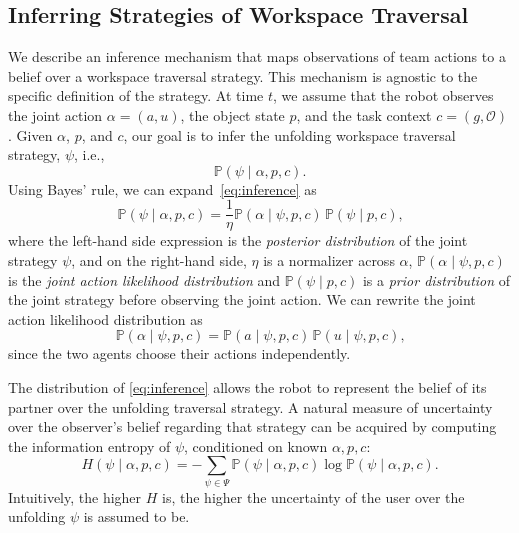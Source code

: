 \subsection{Inferring Strategies of Workspace Traversal}

We describe an inference mechanism that maps observations of team actions to a belief over a workspace traversal strategy. This mechanism is agnostic to the specific definition of the strategy. At time $t$, we assume that the robot observes the joint action $\alpha = (a, u)$, the object state $p$, and the task context $c = (g, \mathcal{O})$. Given $\alpha$, $p$, and $c$, our goal is to infer the unfolding workspace traversal strategy, $\psi$, i.e.,
\begin{equation}
    \mathbb{P}(\psi \mid \alpha, p, c)\mbox{.}\label{eq:inference}
\end{equation}
Using Bayes' rule, we can expand~\eqref{eq:inference} as
\begin{equation}
    \mathbb{P}(\psi \mid \alpha, p, c) = \frac{1}{\eta} \mathbb{P}(\alpha \mid \psi, p, c)\,\mathbb{P}(\psi \mid p, c)\mbox{,}\label{eq:inference-bayes}
\end{equation}
where the left-hand side expression is the \emph{posterior distribution} of the joint strategy $\psi$, and on the right-hand side, $\eta$ is a normalizer across $\alpha$, $\mathbb{P}(\alpha \mid \psi, p, c)$ is the \emph{joint action likelihood distribution} and $\mathbb{P}(\psi \mid p, c)$ is a \emph{prior distribution} of the joint strategy before observing the joint action. We can rewrite the joint action likelihood distribution as
\begin{equation}
    \mathbb{P}(\alpha \mid \psi, p, c) = \mathbb{P}(a \mid \psi, p, c)\,\mathbb{P}(u \mid \psi, p, c)\mbox{,}
\end{equation}
since the two agents choose their actions independently.

The distribution of \eqref{eq:inference} allows the robot to represent the belief of its partner over the unfolding traversal strategy. A natural measure of uncertainty over the observer's belief regarding that strategy can be acquired by computing the information entropy of $\psi$, conditioned on known $\alpha, p, c$:
\begin{equation}
    H\left(\psi \mid \alpha,p,c\right) = - \sum_{\psi \in \Psi} \mathbb{P}(\psi\mid\alpha,p,c) \log \mathbb{P}(\psi\mid\alpha,p,c)\label{eq:entropy}    \mbox{.}
\end{equation}
Intuitively, the higher $H$ is, the higher the uncertainty of the user over the unfolding $\psi$ is assumed to be.


